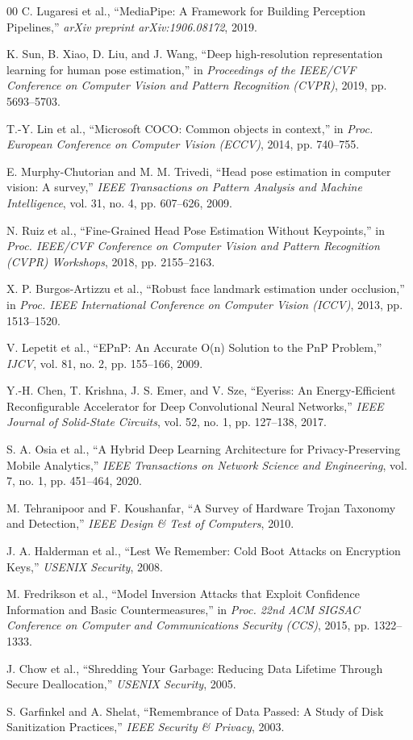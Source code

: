 \documentclass[conference]{IEEEtran}
\begin{document}
\begin{thebibliography}{00}
 C. Lugaresi et al., ``MediaPipe: A Framework for Building Perception Pipelines,'' \textit{arXiv preprint arXiv:1906.08172}, 2019.

 K. Sun, B. Xiao, D. Liu, and J. Wang, ``Deep high-resolution representation learning for human pose estimation,'' in \textit{Proceedings of the IEEE/CVF Conference on Computer Vision and Pattern Recognition (CVPR)}, 2019, pp. 5693--5703.

 T.-Y. Lin et al., ``Microsoft COCO: Common objects in context,'' in \textit{Proc. European Conference on Computer Vision (ECCV)}, 2014, pp. 740--755.

 E. Murphy-Chutorian and M. M. Trivedi, ``Head pose estimation in computer vision: A survey,'' \textit{IEEE Transactions on Pattern Analysis and Machine Intelligence}, vol. 31, no. 4, pp. 607--626, 2009.

 N. Ruiz et al., ``Fine-Grained Head Pose Estimation Without Keypoints,'' in \textit{Proc. IEEE/CVF Conference on Computer Vision and Pattern Recognition (CVPR) Workshops}, 2018, pp. 2155--2163.

 X. P. Burgos-Artizzu et al., ``Robust face landmark estimation under occlusion,'' in \textit{Proc. IEEE International Conference on Computer Vision (ICCV)}, 2013, pp. 1513--1520.

 V. Lepetit et al., ``EPnP: An Accurate O(n) Solution to the PnP Problem,'' \textit{IJCV}, vol. 81, no. 2, pp. 155--166, 2009.

 Y.-H. Chen, T. Krishna, J. S. Emer, and V. Sze, ``Eyeriss: An Energy-Efficient Reconfigurable Accelerator for Deep Convolutional Neural Networks,'' \textit{IEEE Journal of Solid-State Circuits}, vol. 52, no. 1, pp. 127--138, 2017.

 S. A. Osia et al., ``A Hybrid Deep Learning Architecture for Privacy-Preserving Mobile Analytics,'' \textit{IEEE Transactions on Network Science and Engineering}, vol. 7, no. 1, pp. 451--464, 2020.

 M. Tehranipoor and F. Koushanfar, ``A Survey of Hardware Trojan Taxonomy and Detection,'' \textit{IEEE Design \& Test of Computers}, 2010.

 J. A. Halderman et al., ``Lest We Remember: Cold Boot Attacks on Encryption Keys,'' \textit{USENIX Security}, 2008.

 M. Fredrikson et al., ``Model Inversion Attacks that Exploit Confidence Information and Basic Countermeasures,'' in \textit{Proc. 22nd ACM SIGSAC Conference on Computer and Communications Security (CCS)}, 2015, pp. 1322--1333.

 J. Chow et al., ``Shredding Your Garbage: Reducing Data Lifetime Through Secure Deallocation,'' \textit{USENIX Security}, 2005.

 S. Garfinkel and A. Shelat, ``Remembrance of Data Passed: A Study of Disk Sanitization Practices,'' \textit{IEEE Security \& Privacy}, 2003.

\end{thebibliography}
\end{document}
